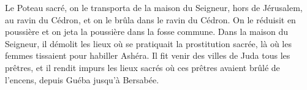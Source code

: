 Le Poteau sacré, on le transporta de la maison du Seigneur,
	hors de Jérusalem, au ravin du Cédron,
	et on le brûla dans le ravin du Cédron.
On le réduisit en poussière et on jeta la poussière dans la fosse commune.
Dans la maison du Seigneur, il démolit les lieux où se pratiquait la prostitution sacrée,
	là où les femmes tissaient pour habiller Ashéra.
Il fit venir des villes de Juda tous les prêtres,
	et il rendit impurs les lieux sacrés où ces prêtres avaient brûlé de l’encens,
	depuis Guéba jusqu’à Bersabée.
